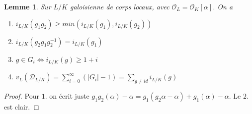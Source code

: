 \documentclass[a4paper,12pt]{book}
\newcommand{\Or}{\mathcal{O}}
\newcommand{\D}{\mathscr{D}}
\theoremstyle{plain}
\newtheorem{lem}{Lemme}
\theoremstyle{definition}
\theoremstyle{remark}
\begin{document}
\begin{lem}
    Sur $L/K$ galoisienne de corps locaux, avec 
    $\Or_L=\Or_K[\alpha]$. On a 
    \begin{enumerate}
        \item $i_{L/K}(g_1g_2)\geq min(i_{L/K}(g_1),i_{L/K}(g_2))$
        \item $i_{L/K}(g_2g_1g_2^{-1})=i_{L/K}(g_1)$
        \item $g\in G_i\Leftrightarrow i_{L/K}(g)\geq 1+i$
        \item $v_L(\D_{L/K})=\sum_{i=0}^\infty (|G_i|-1)=\sum_{g\ne id} i_{L/K}(g)$
    \end{enumerate}
\end{lem}
\begin{proof}
    Pour $1.$ on écrit juste
    $g_1g_2(\alpha)-\alpha=
    g_1(g_2\alpha-\alpha)+g_1(\alpha)-\alpha$. Le $2.$ est
    clair.
\end{proof}
\end{document}

